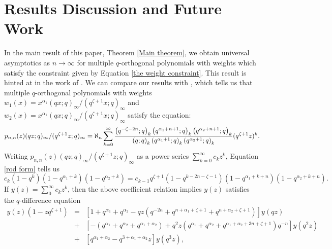 \documentclass[a4paper,reqno]{amsart}
\numberwithin{equation}{section}
\numberwithin{figure}{section}
\begin{document}
\section{Results Discussion and Future Work}
In the main result of this paper, Theorem \ref{Main theorem}, we obtain  universal asymptotics as $n\to\infty$ for multiple $q$-orthogonal polynomials with weights which satisfy the constraint given by Equation \eqref{the weight constraint}. This result is hinted at in the work of \cite{postelmans2005multiple}. We can compare our results with \cite[Equation (2.7)]{postelmans2005multiple}, which tells us that multiple $q$-orthogonal polynomials with weights $w_1(x) = x^{\alpha_1} (qx;q)_\infty/(q^{\zeta+1}x;q)_\infty $ and $w_2(x) = x^{\alpha_1} (qx;q)_\infty/(q^{\zeta+1}x;q)_\infty $ satisfy the equation:
\begin{equation}\label{rod form}
p_{n,n}(z)(qz;q)_\infty/(q^{\zeta+1}z;q)_\infty = \aleph_n \sum_{k=0}^{\infty}\frac{\left(q^{-\zeta-2n};q\right)_{k}\left(q^{\alpha_1 + n +1};q\right)_{k}\left(q^{\alpha_2 + n +1};q\right)_{k}}{\left(q;q\right)_{k}\left(q^{\alpha_1+1};q\right)_{k}\left(q^{\alpha_2+1};q\right)_{k}}\*(q^{\zeta+1}z)^{k}.
\end{equation}
Writing $p_{n,n}(z)(qz;q)_\infty/(q^{\zeta+1}z;q)_\infty $ as a power series $\sum_{k=0}^\infty c_k z^k$, Equation \eqref{rod form} tells us
\[ c_k (1-q^k)(1-q^{\alpha_1+k})(1-q^{\alpha_2+k})  = c_{k-1}q^{\zeta+1}(1-q^{k-2n-\zeta-1})(1-q^{\alpha_1+k+n})(1-q^{\alpha_2+k+n}) .\]
If $y(z)=\sum_{0}^\infty c_kz^k$, then the above coefficient relation implies $y(z)$ satisfies the $q$-difference equation
\begin{eqnarray}\label{general q diff}
y(z)(1-zq^{\zeta+1}) &=& \left[ 1+q^{\alpha_1} + q^{\alpha_2}-qz(q^{-2n}+q^{n+\alpha_1+\zeta+1}+q^{n+\alpha_2+\zeta+1})\right]y(qz) \nonumber \\
&+& \left[-(q^{\alpha_1}+ q^{\alpha_2} + q^{\alpha_1+\alpha_2}) + q^2z(q^{\alpha_1}+q^{\alpha_2}+q^{\alpha_1+\alpha_2+3n+\zeta+1})q^{-n}\right]y(q^2z) \nonumber \\
&+& \left[ q^{\alpha_1+\alpha_2}-q^{3+\alpha_1+\alpha_2}z\right]y(q^3z),\label{rod diff}
\end{eqnarray}
\end{document}
